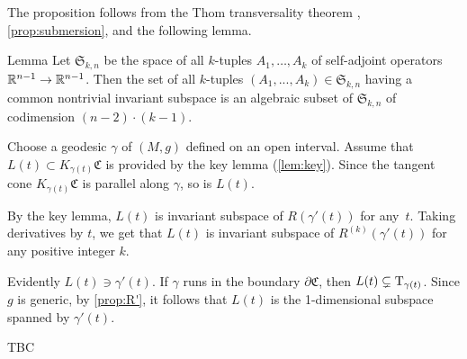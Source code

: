 \documentclass[a4paper,10pt]{article}
\begin{document}

The proposition follows from the Thom transversality theorem \cite[2.3.2]{eliashberg-mishachev}, \ref{prop:submersion}, and the following lemma.


\begin{thm}{Lemma}
Let $\mathfrak{S}_{k,n}$ be the space of all $k$-tuples $A_1,\dots, A_k$ of self-adjoint operators $\mathbb{R}^{n-1}\to\mathbb{R}^{n-1}$.
Then the set of all $k$-tuples $(A_1,...,A_k) \in \mathfrak{S}_{k,n}$ having a common nontrivial invariant subspace is an algebraic subset of $\mathfrak{S}_{k,n}$ of codimension $(n-2)\cdot (k-1)$.
\end{thm}

\qeds

Choose a geodesic $\gamma$ of $(M,g)$ defined on an open interval.
Assume that $L(t)\subset K_{\gamma(t)}\mathfrak{C}$ is provided by the key lemma (\ref{lem:key}).
Since the tangent cone $K_{\gamma(t)}\mathfrak{C}$ is parallel along $\gamma$, so is $L(t)$.

By the key lemma, $L(t)$ is invariant subspace of $R(\gamma'(t))$ for any~$t$.
Taking derivatives by $t$, we get that $L(t)$ is invariant subspace of $R^{(k)}(\gamma'(t))$ for any positive integer $k$.

Evidently $L(t)\ni \gamma'(t)$.
If $\gamma$ runs in the boundary $\partial\mathfrak{C}$, then $L(t)\subsetneq\mathrm{T}_{\gamma(t)}$.
Since $g$ is generic,
by \ref{prop:R'}, it follows that $L(t)$ is the 1-dimensional subspace spanned by $\gamma'(t)$.

TBC
\qeds

\qeds




\end{document}
